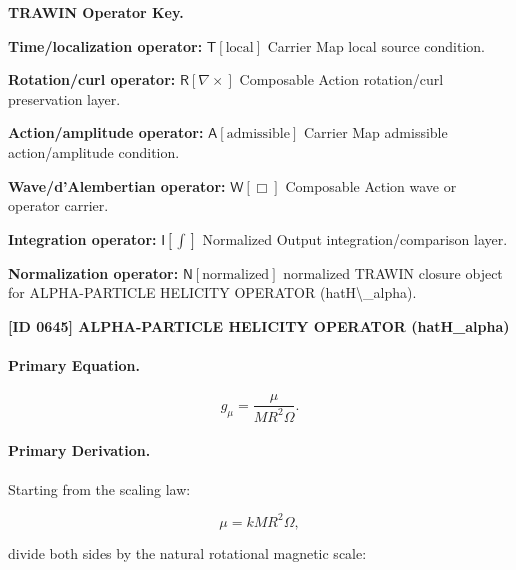 \par\vspace{0.45\baselineskip}
\noindent\begin{minipage}[t]{\linewidth}
\begingroup
\small
\raggedright
\textbf{TRAWIN Operator Key.}\par
\noindent\textbf{Time/localization operator:} $\mathsf{T}\!\left[\mathrm{local}\right]$ Carrier Map local source condition.\par
\noindent\textbf{Rotation/curl operator:} $\mathsf{R}\!\left[\nabla\times\right]$ Composable Action rotation/curl preservation layer.\par
\noindent\textbf{Action/amplitude operator:} $\mathsf{A}\!\left[\mathrm{admissible}\right]$ Carrier Map admissible action/amplitude condition.\par
\noindent\textbf{Wave/d'Alembertian operator:} $\mathsf{W}\!\left[\Box\right]$ Composable Action wave or operator carrier.\par
\noindent\textbf{Integration operator:} $\mathsf{I}\!\left[\int\right]$ Normalized Output integration/comparison layer.\par
\noindent\textbf{Normalization operator:} $\mathsf{N}\!\left[\mathrm{normalized}\right]$ normalized TRAWIN closure object for ALPHA-PARTICLE HELICITY OPERATOR (hatH\textbackslash{}\_alpha).\par
\endgroup
\end{minipage}

\clearpage
\noindent\textbf{[ID 0645] ALPHA-PARTICLE HELICITY OPERATOR (hatH\_alpha)}\par
\vspace{0.35em}
\paragraph{Primary Equation.}
\begin{equation}
g_{\mu}
=
\frac{\mu}
{MR^2\Omega}.
\end{equation}

\paragraph{Primary Derivation.}
Starting from the scaling law:

\begin{equation}
\mu
=
kMR^2\Omega ,
\end{equation}

divide both sides by the natural rotational magnetic scale:

